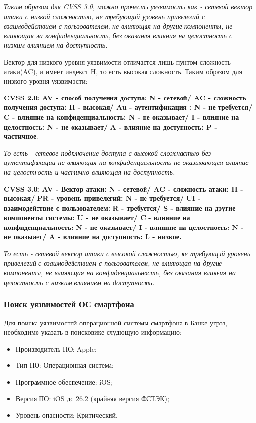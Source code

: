 \documentclass[areasetadvanced]{scrartcl}
\begin{document}
\emph{Таким образом для CVSS 3.0, можно прочесть уязвимость как - сетевой вектор атаки с низкой сложностью, не требующий уровень привелегий с взаимодействием с пользователем, не влияющая на другие компоненты, не влияющая на конфиденциальность, без оказания влияния на целостность с низким влиянием на доступность.}

Вектор для низкого уровня уязвимости отличается лишь пунтом \guillemetleft  сложность атаки\guillemetright (AC), и имеет индекст H, то есть высокая сложность. Таким образом для низкого уровня уязвимости:

\textbf{CVSS 2.0: AV - способ получения доступа: N - сетевой/ AC - сложность получения доступа: H - высокая/ Au - аутентификация : N - не требуется/
C - влияние на конфиденциальность: N - не оказывает/ I - влияние на целостность: N - не оказывает/ A - влияние на доступность: P - частичное.}

\emph{То есть - сетевое подключение доступа с высокой сложнастью без аутентификации не влияющая на конфиденциальность не оказывающая влияние на целостность и частично влияющая на доступность.}

\textbf{CVSS 3.0: AV - Вектор атаки: N - сетевой/ AC - сложность атаки: H - высокая/ PR - уровень привелегий: N - не требуется/ UI - взаимодействие с пользователем: R - требуется/ S - влияние на другие компоненты системы: U - не оказывает/ C - влияние на конфиденциальность: N - не оказывает/ I - влияние на целостность: N - не оказыает/ A - влияние на доступность: L - низкое.}

\emph{То есть - сетевой вектор атаки с высокой сложностью, не требующий уровень привелегий с взаимодействием с пользователем, не влияющая на другие компоненты, не влияющая на конфиденциальность, без оказания влияния на целостность с низким влиянием на доступность.}

\subsubsection{Поиск уязвимостей ОС смартфона}
Для поиска уязвимостей операционной системы смартфона в Банке угроз\cite{bdu}, необходимо указать в поисковике слудющую информацию:

\begin{itemize}
    \item Производитель ПО: Apple;
    \item Тип ПО: Операционная система;
    \item Программное обеспечение: iOS;
    \item Версия ПО: iOS до 26.2 (крайняя версия ФСТЭК);
    \item Уровень опасности: Критический.
\end{itemize}
\end{document}
